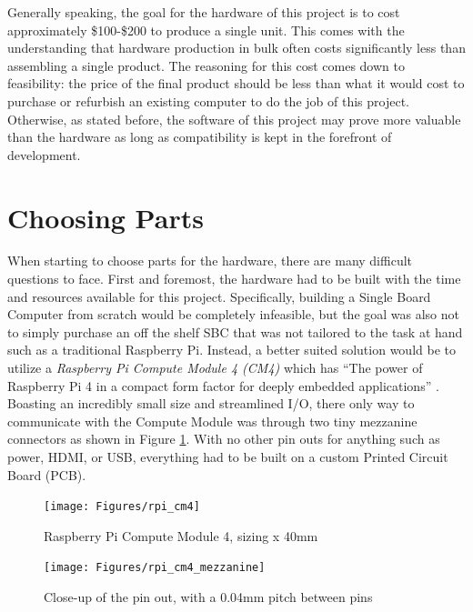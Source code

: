Generally speaking, the goal for the hardware of this project is to cost approximately \$100-\$200 to produce a single unit.
This comes with the understanding that hardware production in bulk often costs significantly less than assembling a single product.
The reasoning for this cost comes down to feasibility: the price of the final product should be less than what it would cost to purchase or refurbish an existing computer to do the job of this project.
Otherwise, as stated before, the software of this project may prove more valuable than the hardware as long as compatibility is kept in the forefront of development.


\section{Choosing Parts}\label{sec:ChoosingParts}

When starting to choose parts for the hardware, there are many difficult questions to face.
First and foremost, the hardware had to be built with the time and resources available for this project.
Specifically, building a Single Board Computer from scratch would be completely infeasible, but the goal was also not to simply purchase an off the shelf SBC that was not tailored to the task at hand such as a traditional Raspberry Pi.
Instead, a better suited solution would be to utilize a \emph{Raspberry Pi Compute Module 4 (CM4)} which has \enquote{The power of Raspberry Pi 4 in a compact form factor for deeply embedded applications} \cite{rpi_cm4}.
Boasting an incredibly small size and streamlined I/O, there only way to communicate with the Compute Module was through two tiny mezzanine connectors as shown in Figure \ref{fig:rpi_cm4_mezzanine}.
With no other pin outs for anything such as power, HDMI, or USB, everything had to be built on a custom Printed Circuit Board (PCB).

\begin{figure}[h]
  \centering
  \begin{minipage}{0.45\textwidth}
    \centering
    \texttt{[image: Figures/rpi\_cm4]}
    \captionsetup{width=.75\linewidth}
    \caption[Raspberry Pi Compute Module 4]{Raspberry Pi Compute Module 4, sizing x 40mm}
    \label{fig:rpi_cm4}
  \end{minipage}\hfill
  \begin{minipage}{0.45\textwidth}
    \centering
    \texttt{[image: Figures/rpi\_cm4\_mezzanine]}
    \captionsetup{width=.75\linewidth}
    \caption[Raspberry Pi Compute Module 4 Pin out]{Close-up of the pin out, with a 0.04mm pitch between pins}
    \label{fig:rpi_cm4_mezzanine}
  \end{minipage}
\end{figure}

